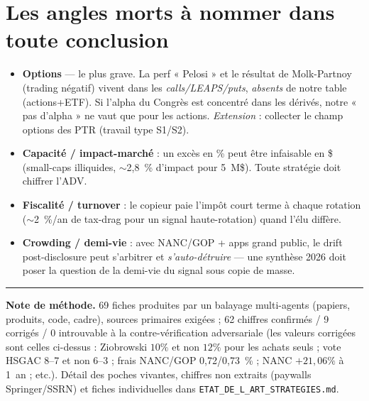\documentclass[11pt,a4paper]{article}
\newcommand{\code}[1]{\texttt{\small #1}}
\begin{document}
\section{Les angles morts à nommer dans toute conclusion}

\begin{itemize}
  \item \textbf{Options} --- le plus grave. La perf « Pelosi » et le résultat de Molk-Partnoy (trading
  négatif) vivent dans les \emph{calls/LEAPS/puts}, \emph{absents} de notre table (actions+ETF). Si l'alpha du
  Congrès est concentré dans les dérivés, notre « pas d'alpha » ne vaut que pour les actions. \emph{Extension} :
  collecter le champ options des PTR (travail type S1/S2).
  \item \textbf{Capacité / impact-marché} : un excès en \% peut être infaisable en \$ (small-caps illiquides,
  $\sim$2,8~\% d'impact pour 5~M\$). Toute stratégie doit chiffrer l'ADV.
  \item \textbf{Fiscalité / turnover} : le copieur paie l'impôt court terme à chaque rotation ($\sim$2~\%/an de
  tax-drag pour un signal haute-rotation) quand l'élu diffère.
  \item \textbf{Crowding / demi-vie} : avec NANC/GOP + apps grand public, le drift post-disclosure peut
  s'arbitrer et \emph{s'auto-détruire} --- une synthèse 2026 doit poser la question de la demi-vie du signal
  sous copie de masse.
\end{itemize}

\vspace{0.6em}
\hrule
\vspace{0.4em}
{\small\color{gris}\textbf{Note de méthode.} 69 fiches produites par un balayage multi-agents (papiers,
produits, code, cadre), sources primaires exigées ; 62 chiffres confirmés / 9 corrigés / 0 introuvable à la
contre-vérification adversariale (les valeurs corrigées sont celles ci-dessus : Ziobrowski $10\%$ et non
$12\%$ pour les achats seuls ; vote HSGAC 8--7 et non 6--3 ; frais NANC/GOP 0,72/0,73~\% ; NANC $+21{,}06\%$
à 1~an ; etc.). Détail des poches vivantes, chiffres non extraits (paywalls Springer/SSRN) et fiches
individuelles dans \code{ETAT\_DE\_L\_ART\_STRATEGIES.md}.}
\end{document}

